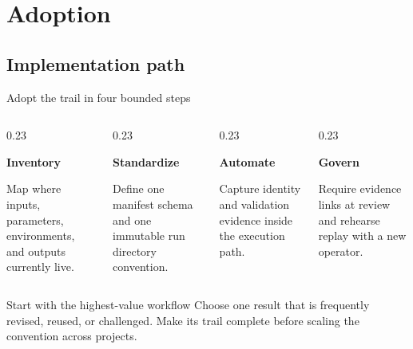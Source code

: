 \section{Adoption}
\subsection{Implementation path}

\begin{frame}{Adopt the trail in four bounded steps}
  \begin{columns}[T,onlytextwidth]
    \begin{column}{0.23\textwidth}
      \par\vspace{0.12cm}
      \textbf{Inventory}\par
      \small Map where inputs, parameters, environments, and outputs currently live.
    \end{column}
    \begin{column}{0.23\textwidth}
      \par\vspace{0.12cm}
      \textbf{Standardize}\par
      \small Define one manifest schema and one immutable run directory convention.
    \end{column}
    \begin{column}{0.23\textwidth}
      \par\vspace{0.12cm}
      \textbf{Automate}\par
      \small Capture identity and validation evidence inside the execution path.
    \end{column}
    \begin{column}{0.23\textwidth}
      \par\vspace{0.12cm}
      \textbf{Govern}\par
      \small Require evidence links at review and rehearse replay with a new operator.
    \end{column}
  \end{columns}

  \vspace{0.65cm}
  \begin{block}{Start with the highest-value workflow}
    Choose one result that is frequently revised, reused, or challenged. Make its
    trail complete before scaling the convention across projects.
  \end{block}
\end{frame}

